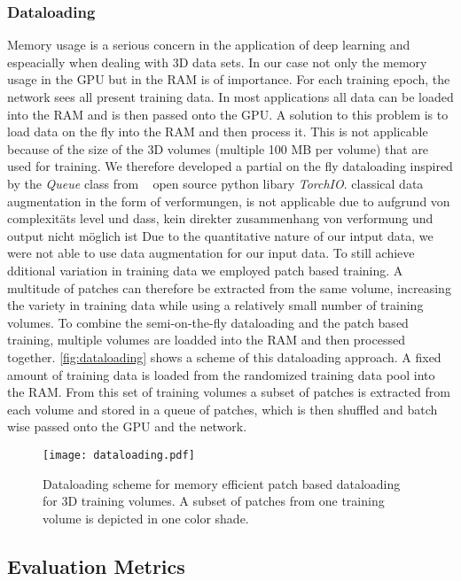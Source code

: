 \subsubsection{Dataloading}

Memory usage is a serious concern in the application of deep learning and espeacially when dealing with 3D data sets. 
In our case not only the memory usage in the \ac{GPU} but in the \ac{RAM} is of importance. For each training epoch, the network sees all present training data. 
In most applications all data can be loaded into the \acs{RAM} and is then passed onto the \acs{GPU}.
A solution to this problem is to load data on the fly into the RAM and then process it.
This is not applicable because of the size of the 3D volumes (multiple 100 MB per volume) that are used for training. 
We therefore developed a partial on the fly dataloading inspired by the \emph{Queue} class from \citeauthor{perez-garcia_torchio_2021}~\cite{perez-garcia_torchio_2021} open source python libary \emph{TorchIO}. 
classical data augmentation in the form of verformungen, is not applicable due to aufgrund von complexitäts level und dass, kein direkter zusammenhang von verformung und output nicht möglich ist
Due to the quantitative nature of our intput data, we were not able to use data augmentation for our input data. 
To still achieve dditional variation in training data we employed patch based training. 
A multitude of patches can therefore be extracted from the same volume, increasing the variety in training data while using a relatively small number of training volumes. 
To combine the semi-on-the-fly dataloading and the patch based training, multiple volumes are loadded into the RAM and then processed together. 
\autoref{fig:dataloading} shows a scheme of this dataloading approach. 
A fixed amount of training data is loaded from the randomized training data pool into the RAM. 
From this set of training volumes a subset of patches is extracted from each volume and stored in a queue of patches, which is then shuffled and batch wise passed onto the GPU and the network. 

\begin{figure}
    \centering
    \texttt{[image: dataloading.pdf]}
    \caption{Dataloading scheme for memory efficient patch based dataloading for 3D training volumes. A subset of patches from one training volume is depicted in one color shade.}\label{fig:dataloading}
\end{figure}

\subsection{Evaluation Metrics}


